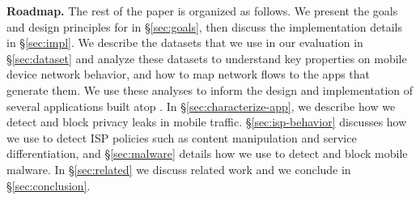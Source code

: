 \noindent\textbf{Roadmap.} The rest of the paper is organized as follows. We present the goals and design principles for \meddle in \S\ref{sec:goals}, then 
discuss the implementation details in \S\ref{sec:impl}. We describe the datasets that we use in our evaluation in \S\ref{sec:dataset} and 
analyze these datasets to understand key properties on mobile device network behavior, and how to map network flows to the 
apps that generate them. We use these analyses to inform the design and implementation of several applications built atop \meddle. 
In \S\ref{sec:characterize-app}, we describe how we detect and block privacy leaks in mobile traffic. \S\ref{sec:isp-behavior} discusses 
how we use \meddle to detect ISP policies such as content manipulation and service differentiation, and \S\ref{sec:malware} details 
how we use \meddle to detect and block mobile malware. In \S\ref{sec:related} we discuss related work and we conclude in \S\ref{sec:conclusion}.

